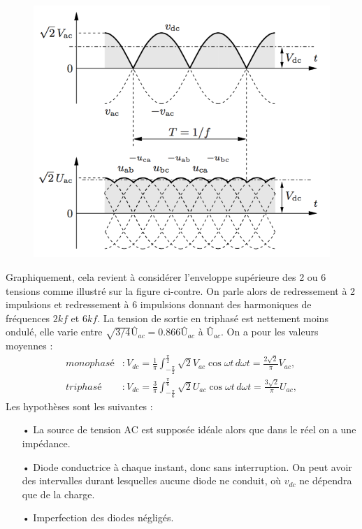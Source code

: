 	\begin{figure}
	\vspace{-5mm}
	\includegraphics[scale=0.3]{ch2/9}
	\end{figure} 			
	Graphiquement, cela revient à considérer l'enveloppe supérieure des 2 ou 6 tensions comme illustré sur la figure ci-contre. On parle alors de redressement à 2 impulsions et redressement à 6 impulsions donnant des harmoniques de fréquences $2kf$ et $6kf$. La tension de sortie en triphasé est nettement moins ondulé, elle varie entre $\sqrt{3/4}Û_{ac} = 0.866 Û_{ac}$ à $Û_{ac}$. On a pour les valeurs moyennes :
	\begin{equation}
		\begin{aligned}
		monophasé &: V_{dc} = \frac{1}{\pi}\int _{-\frac{\pi}{2}} ^ {\frac{\pi}{2}} \sqrt{2} V_{ac} \cos \omega t \, d\omega t = \frac{2\sqrt{2}}{\pi} V_{ac},\\
		triphasé &: V_{dc} = \frac{3}{\pi}\int _{-\frac{\pi}{6}} ^ {\frac{\pi}{6}} \sqrt{2} U_{ac} \cos \omega t \, d\omega t = \frac{3\sqrt{2}}{\pi} U_{ac},
		\end{aligned}
		\label{eq:2.14}
	\end{equation}
	Les hypothèses sont les suivantes : 
	\begin{itemize}
		\item[•] La source de tension AC est supposée idéale alors que dans le réel on a une impédance. 
		\item[•] Diode conductrice à chaque instant, donc sans interruption. On peut avoir des intervalles durant lesquelles aucune diode ne conduit, où $v_{dc}$ ne dépendra que de la charge. 
		\item[•] Imperfection des diodes négligés. 
	\end{itemize}
	
